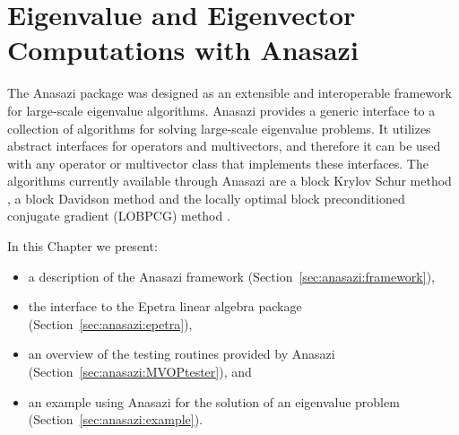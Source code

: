 % 
% 
% 
%   
%   
% 
% 

\section{Eigenvalue and Eigenvector Computations with Anasazi}
\label{chap:anasazi}

The Anasazi package was designed as an extensible and interoperable framework
for large-scale eigenvalue algorithms. Anasazi provides a generic interface to
a collection of algorithms for solving large-scale eigenvalue problems. It
utilizes abstract interfaces for operators and multivectors, and therefore it
can be used with any operator or multivector class that implements these
interfaces. The algorithms currently available through Anasazi are a block
Krylov Schur method \cite{Stewart2001}, a block Davidson method and the locally
optimal block preconditioned conjugate gradient (LOBPCG) method
\cite{Knyazev2001}.

In this Chapter we present:
\begin{itemize}
\item a description of the Anasazi framework (Section~\ref{sec:anasazi:framework}),
\item the interface to the Epetra linear algebra package
(Section~\ref{sec:anasazi:epetra}), 
\item an overview of the testing routines provided by Anasazi
(Section~\ref{sec:anasazi:MVOPtester}), and
\item an example using Anasazi for the solution of an eigenvalue problem 
(Section~\ref{sec:anasazi:example}).
\end{itemize}


